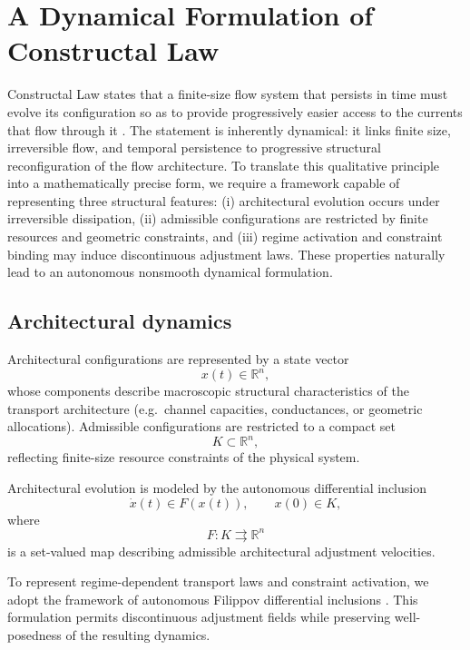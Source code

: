\documentclass[12pt]{article}
\theoremstyle{plain}
\theoremstyle{definition}
\theoremstyle{remark}
\begin{document}
\section{A Dynamical Formulation of Constructal Law}
\label{sec:model}

Constructal Law states that a finite-size flow system that persists in
time must evolve its configuration so as to provide progressively easier
access to the currents that flow through it
\cite{Bejan2000Book,BejanLorente2011,BejanLorente2013JAP}.
The statement is inherently dynamical: it links finite size,
irreversible flow, and temporal persistence to progressive structural
reconfiguration of the flow architecture.
To translate this qualitative principle into a mathematically precise
form, we require a framework capable of representing three structural
features:
(i) architectural evolution occurs under irreversible dissipation,
(ii) admissible configurations are restricted by finite resources and
geometric constraints, and
(iii) regime activation and constraint binding may induce discontinuous
adjustment laws.
These properties naturally lead to an autonomous nonsmooth dynamical
formulation.

\subsection{Architectural dynamics}

Architectural configurations are represented by a state vector
\[
x(t)\in\mathbb{R}^n ,
\]
whose components describe macroscopic structural characteristics of the
transport architecture (e.g.\ channel capacities, conductances, or
geometric allocations).
Admissible configurations are restricted to a compact set
\[
K\subset\mathbb{R}^n ,
\]
reflecting finite-size resource constraints of the physical system.

Architectural evolution is modeled by the autonomous differential
inclusion
\begin{equation}
\dot{x}(t)\in F(x(t)),
\qquad
x(0)\in K,
\label{eq:filippov_inclusion}
\end{equation}
where
\[
F:K\rightrightarrows\mathbb{R}^n
\]
is a set-valued map describing admissible architectural adjustment
velocities.

To represent regime-dependent transport laws and constraint activation,
we adopt the framework of autonomous Filippov differential inclusions
\cite{Filippov1988,Clarke1983,diBernardo2008,Cortes2009}.
This formulation permits discontinuous adjustment fields while
preserving well-posedness of the resulting dynamics.
\end{document}
